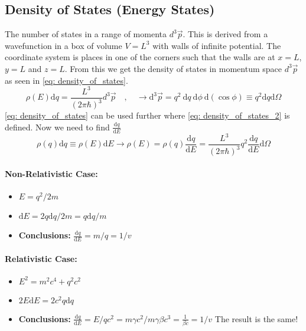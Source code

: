 \subsection{Density of States (Energy States)}
The number of states in a range of momenta $d^3 \vec{p}$. This is derived from a wavefunction in a box of volume $V = L^3$ with walls of infinite potential. The coordinate system is places in one of the corners such that the walls are at $x = L$, $y = L$ and $z = L$. From this we get the density of states in momentum space $d^3 \vec{p}$ as seen in \cref{eq: density_of_states}.
\begin{equation}\label{eq: density_of_states}
 ρ(E) \mathrm{d}q = \frac{L^3}{(2πℏ)^3} d^3 \vec{p} \quad , \quad  → \mathrm{d}^3 \vec{p} = q^2 \ \mathrm{d}q \ \mathrm{d}ϕ \ \mathrm{d}(\cos ϕ) ≡ q^2 \mathrm{d}q \mathrm{d}Ω
\end{equation}
\cref{eq: density_of_states} can be used further where \cref{eq: density_of_states_2} is defined. Now we need to find $\frac{\mathrm{d}q}{\mathrm{d}E}$
\begin{equation}\label{eq: density_of_states_2}
    ρ(q)\mathrm{d}q ≡ ρ(E)\mathrm{d}E → ρ(E) = ρ(q) \frac{\mathrm{d}q}{\mathrm{d}E} = \frac{L^3}{(2πℏ)^3} q^2 \frac{\mathrm{d}q}{\mathrm{d}E} \mathrm{d}Ω
\end{equation}
\paragraph{Non-Relativistic Case:}
\begin{itemize}
    \item $E = q^2 / 2m$
    \item $\mathrm{d}E = 2q \mathrm{d}q / 2m = q \mathrm{d}q /m$
    \item \textbf{Conclusions:} $\frac{\mathrm{d}q}{\mathrm{d}E} = m / q = 1 / v$
\end{itemize}

\paragraph{Relativistic Case:}
\begin{itemize}
    \item $E^2 = m^2c^{4} + q^2 c^2$
    \item $2E \mathrm{d}E = 2c^2 q \mathrm{d}q$
    \item \textbf{Conclusions:} $\frac{\mathrm{d}q}{\mathrm{d}E} = E / qc^2 = mγc^2 / mγβc^3 =  \frac{1}{ βc} = 1 / v$
    The result is the same!
\end{itemize}

